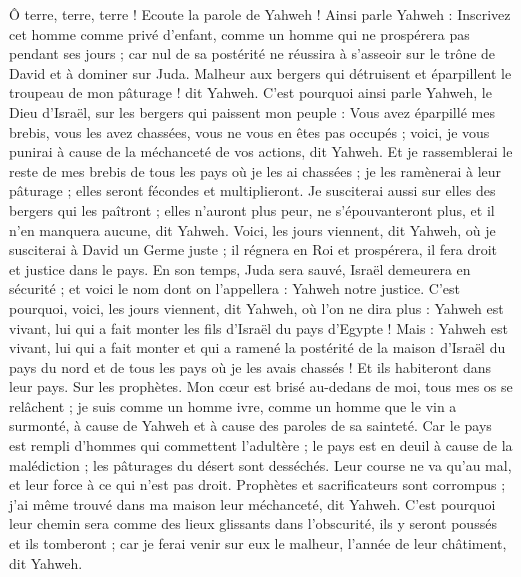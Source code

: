 \begin{multicols}{2}
Ô terre, terre, terre ! Ecoute la parole de Yahweh !
Ainsi parle Yahweh : Inscrivez cet homme comme privé d'enfant, comme un homme qui ne prospérera pas pendant ses jours ; car nul de sa postérité ne réussira à s'asseoir sur le trône de David et à dominer sur Juda.
\VerseOne{}Malheur aux bergers qui détruisent et éparpillent le troupeau de mon pâturage ! dit Yahweh.
C'est pourquoi ainsi parle Yahweh, le Dieu d'Israël, sur les bergers qui paissent mon peuple : Vous avez éparpillé mes brebis, vous les avez chassées, vous ne vous en êtes pas occupés ; voici, je vous punirai à cause de la méchanceté de vos actions, dit Yahweh.
Et je rassemblerai le reste de mes brebis de tous les pays où je les ai chassées ; je les ramènerai à leur pâturage ; elles seront fécondes et multiplieront.
Je susciterai aussi sur elles des bergers qui les paîtront ; elles n'auront plus peur, ne s'épouvanteront plus, et il n'en manquera aucune, dit Yahweh.
Voici, les jours viennent, dit Yahweh, où je susciterai à David un Germe juste ; il régnera en Roi et prospérera, il fera droit et justice dans le pays.
En son temps, Juda sera sauvé, Israël demeurera en sécurité ; et voici le nom dont on l'appellera : Yahweh notre justice.
C'est pourquoi, voici, les jours viennent, dit Yahweh, où l'on ne dira plus : Yahweh est vivant, lui qui a fait monter les fils d'Israël du pays d'Egypte !
Mais : Yahweh est vivant, lui qui a fait monter et qui a ramené la postérité de la maison d'Israël du pays du nord et de tous les pays où je les avais chassés ! Et ils habiteront dans leur pays.
Sur les prophètes. Mon cœur est brisé au-dedans de moi, tous mes os se relâchent ; je suis comme un homme ivre, comme un homme que le vin a surmonté, à cause de Yahweh et à cause des paroles de sa sainteté.
Car le pays est rempli d'hommes qui commettent l'adultère ; le pays est en deuil à cause de la malédiction ; les pâturages du désert sont desséchés. Leur course ne va qu'au mal, et leur force à ce qui n'est pas droit.
Prophètes et sacrificateurs sont corrompus ; j'ai même trouvé dans ma maison leur méchanceté, dit Yahweh.
C'est pourquoi leur chemin sera comme des lieux glissants dans l'obscurité, ils y seront poussés et ils tomberont ; car je ferai venir sur eux le malheur, l'année de leur châtiment, dit Yahweh.

\end{multicols}
